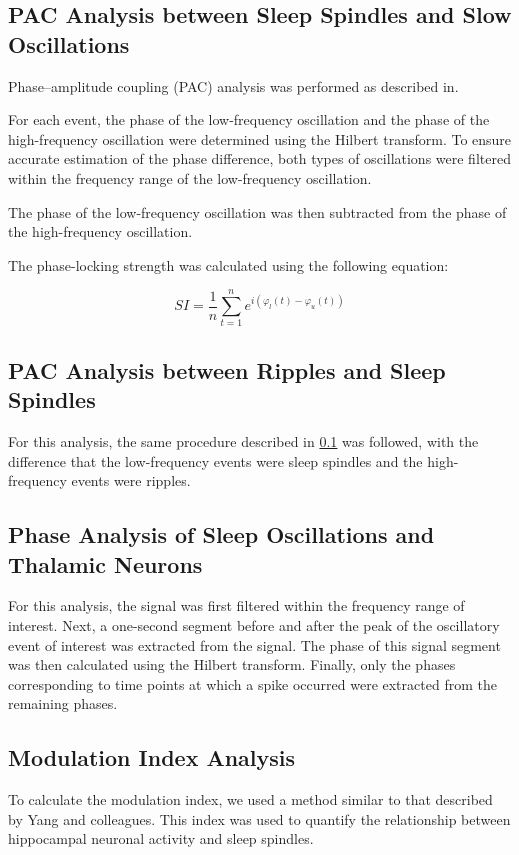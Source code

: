 \documentclass[12pt]{report}
\begin{document}
	\subsection{PAC Analysis between Sleep Spindles and Slow Oscillations} 
	\label{PAC Analysis between Sleep Spindles and Slow Oscillations}
	Phase–amplitude coupling (PAC) analysis was performed as described in\cite{Ladenbauer2017}.
	
	For each event, the phase of the low-frequency oscillation and the phase of the high-frequency oscillation were determined using the Hilbert transform. To ensure accurate estimation of the phase difference, both types of oscillations were filtered within the frequency range of the low-frequency oscillation.
	
	The phase of the low-frequency oscillation was then subtracted from the phase of the high-frequency oscillation.
	
	The phase-locking strength was calculated using the following equation:
	
	$$
	SI = \frac{1}{n}\sum_{t=1}^{n} e^{i(\varphi_l(t)-\varphi_u(t))}
	$$
	
	\subsection{PAC Analysis between Ripples and Sleep Spindles} 
	\label{PAC Analysis between Ripples and Sleep Spindles}
	For this analysis, the same procedure described in \ref{PAC Analysis between Sleep Spindles and Slow Oscillations} was followed, with the difference that the low-frequency events were sleep spindles and the high-frequency events were ripples.
	
	\subsection{Phase Analysis of Sleep Oscillations and Thalamic Neurons} 
	\label{Phase Analysis of Sleep Oscillations and Thalamic Neurons}
	For this analysis, the signal was first filtered within the frequency range of interest. Next, a one-second segment before and after the peak of the oscillatory event of interest was extracted from the signal. The phase of this signal segment was then calculated using the Hilbert transform. Finally, only the phases corresponding to time points at which a spike occurred were extracted from the remaining phases\cite{Alizadeh2022}.
	\subsection{Modulation Index Analysis}
	\label{Modulation Index Analysis}
	To calculate the modulation index, we used a method similar to that described by Yang and colleagues\cite{Watson2016}. This index was used to quantify the relationship between hippocampal neuronal activity and sleep spindles.
	
\end{document}
